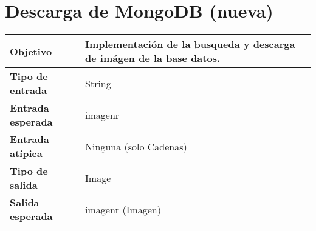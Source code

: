 \documentclass{scrreprt}
\begin{document}
\section{Descarga de MongoDB (nueva)}
\vspace{0.3cm}
\begin{center}
    \begin{tabular}{|p{4.0cm}|p{9.0cm}|}
        \hline
	    \textbf{Objetivo} & Implementación de la busqueda y descarga de imágen de la base datos. \\
        \hline
	    \textbf{Tipo de entrada} & String \\
        \hline
	    \textbf{Entrada esperada} & imagenr \\
        \hline
	    \textbf{Entrada atípica} & Ninguna (solo Cadenas) \\
        \hline
	    \textbf{Tipo de salida} & Image \\
        \hline
	    \textbf{Salida esperada} & imagenr (Imagen) \\
        \hline        
    \end{tabular}
\end{center}
\end{document}
